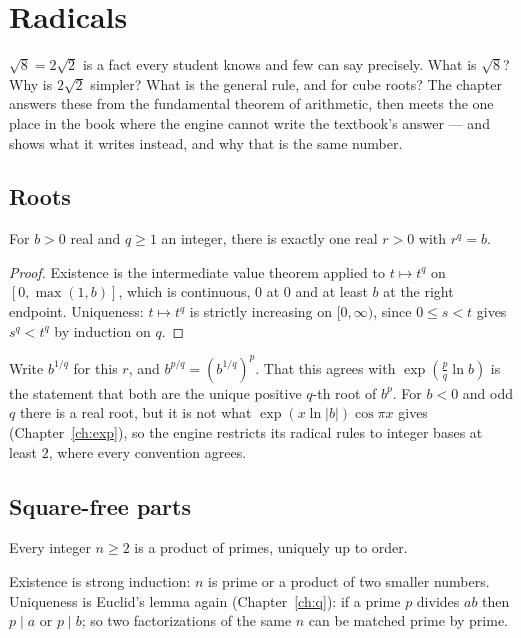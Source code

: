 \chapter{Radicals}\label{ch:rad}

$\sqrt 8 = 2\sqrt 2$ is a fact every student knows and few can say precisely. What is $\sqrt 8$?
Why is $2\sqrt 2$ simpler? What is the general rule, and for cube roots? The chapter answers
these from the fundamental theorem of arithmetic, then meets the one place in the book where the
engine cannot write the textbook's answer --- and shows what it writes instead, and why that is
the same number.

\section{Roots}

\begin{theorem}
  For $b > 0$ real and $q \ge 1$ an integer, there is exactly one real $r > 0$ with $r^q = b$.
\end{theorem}
\begin{proof}
  Existence is the intermediate value theorem applied to $t \mapsto t^q$ on $[0, \max(1, b)]$,
  which is continuous, $0$ at $0$ and at least $b$ at the right endpoint. Uniqueness: $t \mapsto
  t^q$ is strictly increasing on $[0, \infty)$, since $0 \le s < t$ gives $s^q < t^q$ by
  induction on $q$.
\end{proof}

Write $b^{1/q}$ for this $r$, and $b^{p/q} = (b^{1/q})^p$. That this agrees with
$\exp(\frac{p}{q}\ln b)$ is the statement that both are the unique positive $q$-th root of $b^p$.
For $b < 0$ and odd $q$ there is a real root, but it is not what $\exp(x \ln |b|)\cos \pi x$
gives (Chapter~\ref{ch:exp}), so the engine restricts its radical rules to integer bases at
least $2$, where every convention agrees.

\section{Square-free parts}

\begin{theorem}
  Every integer $n \ge 2$ is a product of primes, uniquely up to order.
\end{theorem}

Existence is strong induction: $n$ is prime or a product of two smaller numbers. Uniqueness is
Euclid's lemma again (Chapter~\ref{ch:q}): if a prime $p$ divides $ab$ then $p \mid a$ or
$p \mid b$; so two factorizations of the same $n$ can be matched prime by prime.

